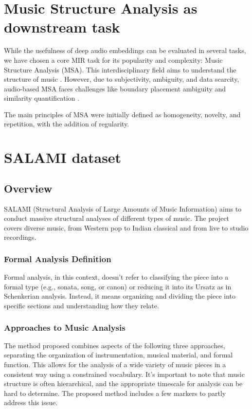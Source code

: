 \section{Music Structure Analysis as downstream task}

While the usefulness of deep audio embeddings can be evaluated in several tasks, we have chosen a core MIR task for its popularity and complexity: Music Structure Analysis (MSA). This interdisciplinary field aims to understand the structure of music \cite{Nieto2020Audio-BasedApplications}. However, due to subjectivity, ambiguity, and data scarcity, audio-based MSA faces challenges like boundary placement ambiguity and similarity quantification \cite{NietoPerceptualMusic}. 

The main principles of MSA were initially defined as homogeneity, novelty, and repetition, with the addition of regularity. 



\section{SALAMI dataset}
\subsection{Overview}

SALAMI (Structural Analysis of Large Amounts of Music Information) \cite{Smith2011DESIGNANNOTATIONS} aims to conduct massive structural analyses of different types of music. The project covers diverse music, from Western pop to Indian classical and from live to studio recordings.

\subsubsection{Formal Analysis Definition}
Formal analysis, in this context, doesn't refer to classifying the piece into a formal type (e.g., sonata, song, or canon) or reducing it into its Ursatz as in Schenkerian analysis. Instead, it means organizing and dividing the piece into specific sections and understanding how they relate.


\subsubsection{Approaches to Music Analysis}

The method proposed combines aspects of the following three approaches, separating the organization of instrumentation, musical material, and formal function. This allows for the analysis of a wide variety of music pieces in a consistent way using a constrained vocabulary. It's important to note that music structure is often hierarchical, and the appropriate timescale for analysis can be hard to determine. The proposed method includes a few markers to partly address this issue.

